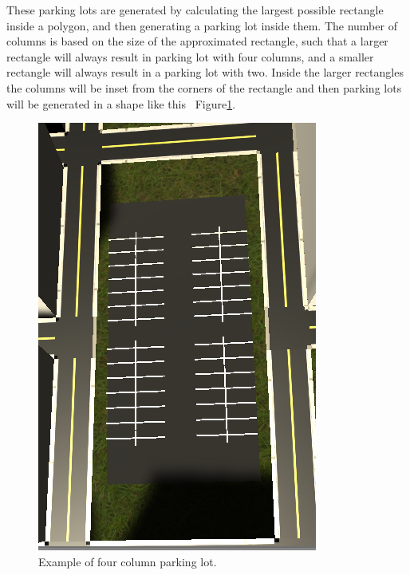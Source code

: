These parking lots are generated by calculating the largest possible rectangle inside a polygon, and then generating a parking lot inside them.
The number of columns is based on the size of the approximated rectangle, such that a larger rectangle will always result in parking lot with four columns, and a smaller rectangle will always result in a parking lot with two.
Inside the larger rectangles the columns will be inset from the corners of the rectangle and then parking lots will be generated in a shape like this ~Figure\ref{fig:bigparking}.
\begin{figure}[H]
\includegraphics[width=\linewidth]{figure/bigp.PNG}
\caption{Example of four column parking lot.}
\label{fig:bigparking}
\end{figure}
